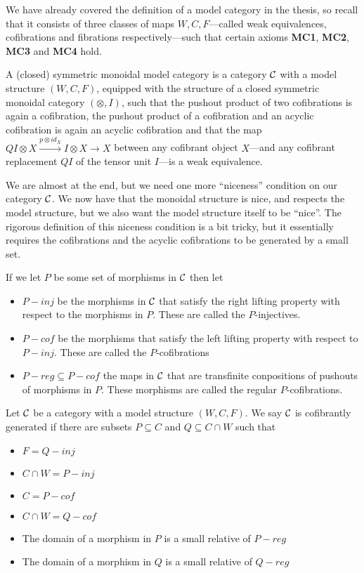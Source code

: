 We have already covered the definition of a model category in the thesis, so recall that it consists of three classes of maps $W, C, F$---called weak equivalences, cofibrations and fibrations respectively---such that certain axioms \textbf{MC1}, \textbf{MC2}, \textbf{MC3} and \textbf{MC4} hold. 

\begin{definition}
A (closed) symmetric monoidal model category is a category $\mathcal{C}$ with a model structure $(W, C, F)$, equipped with the structure of a closed symmetric monoidal category $(\otimes, I)$, such that the pushout product of two cofibrations is again a cofibration, the pushout product of a cofibration and an acyclic cofibration is again an acyclic cofibration and that the map $QI\otimes X \overset{p\otimes id_X}\to I\otimes X \to X$ between any cofibrant object $X$---and any cofibrant replacement $QI$ of the tensor unit $I$---is a weak equivalence. 
\end{definition}

We are almost at the end, but we need one more ``niceness'' condition on our category $\mathcal{C}$. We now have that the monoidal structure is nice, and respects the model structure, but we also want the model structure itself to be ``nice''. The rigorous definition of this niceness condition is a bit tricky, but it essentially requires the cofibrations and the acyclic cofibrations to be generated by a small set. 

If we let $P$ be some set of morphisms in $\mathcal{C}$ then let 
\begin{itemize}
    \item $P-inj$ be the morphisms in $\mathcal{C}$ that satisfy the right lifting property with respect to the morphisms in $P$. These are called the $P$-injectives.
    \item $P-cof$ be the morphisms that satisfy the left lifting property with respect to $P-inj$. These are called the $P$-cofibrations
    \item $P-reg \subseteq P-cof$ the maps in $\mathcal{C}$ that are transfinite conpositions of pushouts of morphisms in $P$. These morphisms are called the regular $P$-cofibrations. 
\end{itemize}

\begin{definition}
Let $\mathcal{C}$ be a category with a model structure $(W, C, F)$. We say $\mathcal{C}$ is cofibrantly generated if there are subsets $P\subseteq C$ and $Q\subseteq C\cap W$ such that 
\begin{itemize}
    \item $F = Q-inj$
    \item $C\cap W = P-inj$
    \item $C = P-cof$
    \item $C\cap W = Q-cof$ 
    \item The domain of a morphism in $P$ is a small relative of $P-reg$
    \item The domain of a morphism in $Q$ is a small relative of $Q-reg$
\end{itemize}
\end{definition}

